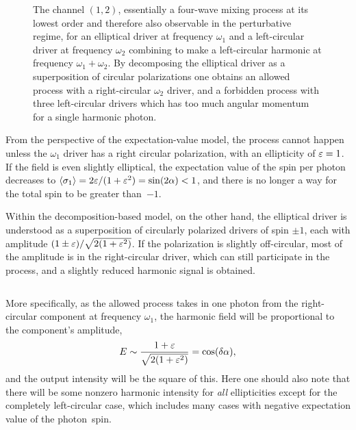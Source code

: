 \begin{figure}[ht]
  \centering
  
  
  \vspace{3mm}
  \caption[
  Feynman diagram for the $(1,2)$ channel in bicircular HHG with one elliptical and one circular driver
  ]{
  The channel $(1,2)$, essentially a four-wave mixing process at its lowest order and therefore also observable in the perturbative regime, for an elliptical driver at frequency $\omega_1$ and a left-circular driver at frequency $\omega_2$ combining to make a left-circular harmonic at frequency $\omega_1+\omega_2$. By decomposing the elliptical driver as a superposition of circular polarizations one obtains an allowed process with a right-circular $\omega_2$ driver, and a forbidden process with three left-circular drivers which has too much angular momentum for a single harmonic photon.
  }
\label{f8-four-wave-mixing-diagram}
\end{figure}






From the perspective of the expectation-value model, the process cannot happen unless the $\omega_1$ driver has a right circular polarization, with an ellipticity of $\varepsilon=1$. If the field is even slightly elliptical, the expectation value of the spin per photon decreases to $\langle\sigma_1\rangle  =2\varepsilon/(1+\varepsilon^2) =\sin(2\alpha) <1$, and there is no longer a way for the total spin to be greater than~$-1$.

Within the decomposition-based model, on the other hand, the elliptical driver is understood as a superposition of circularly polarized drivers of spin $\pm1$, each with amplitude $(1\pm\varepsilon)/\sqrt{2(1+\varepsilon^2)}$. If the polarization is slightly off-circular, most of the amplitude is in the right-circular driver, which can still participate in the process, and a slightly reduced harmonic signal is obtained. 

$\quad$

More specifically, as the allowed process takes in one photon from the right-circular component at frequency $\omega_1$, the harmonic field will be proportional to the component's amplitude,
\begin{equation}
E\sim\frac{1+\varepsilon}{\sqrt{2(1+\varepsilon^2)}}=\cos(\delta\alpha),
\end{equation}
and the output intensity will be the square of this. Here one should also note that there will be some nonzero harmonic intensity for \textit{all} ellipticities except for the completely left-circular case, which includes many cases with negative expectation value of the \mbox{photon spin}.



